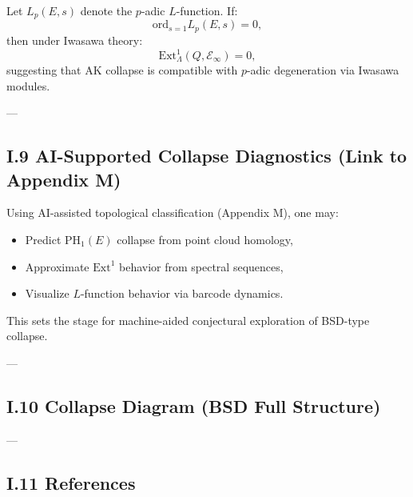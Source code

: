\documentclass[11pt]{article}
\newcommand{\Sha}{\mathbb{S}}
\begin{document}
Let $L_p(E,s)$ denote the $p$-adic $L$-function.  
If:
\[
\mathrm{ord}_{s=1} L_p(E,s) = 0,
\]
then under Iwasawa theory:
\[
\mathrm{Ext}^1_{\Lambda}(Q, \mathcal{E}_\infty) = 0,
\]
suggesting that AK collapse is compatible with $p$-adic degeneration via Iwasawa modules.

---

\subsection*{I.9 AI-Supported Collapse Diagnostics (Link to Appendix M)}

Using AI-assisted topological classification (Appendix M), one may:
\begin{itemize}
  \item Predict $\mathrm{PH}_1(E)$ collapse from point cloud homology,
  \item Approximate $\mathrm{Ext}^1$ behavior from spectral sequences,
  \item Visualize $L$-function behavior via barcode dynamics.
\end{itemize}

This sets the stage for machine-aided conjectural exploration of BSD-type collapse.

---

\subsection*{I.10 Collapse Diagram (BSD Full Structure)}

\begin{center}
\end{center}

---

\subsection*{I.11 References}
\end{document}
